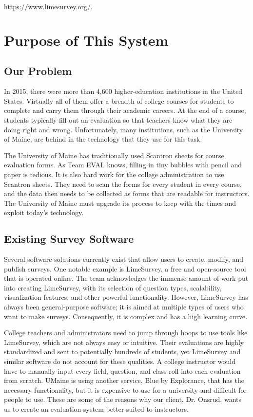 \documentclass{article}
\begin{document}
https://www.limesurvey.org/.

\section{Purpose of This System}

\subsection{Our Problem}

In 2015, there were more than 4,600 higher-education institutions in the United States. Virtually all of them offer a breadth of college courses for students to complete and carry them through their academic careers. At the end of a course, students typically fill out an evaluation so that teachers know what they are doing right and wrong. Unfortunately, many institutions, such as the University of Maine, are behind in the technology that they use for this task.

The University of Maine has traditionally used Scantron sheets for course evaluation forms. As Team EVAL knows, filling in tiny bubbles with pencil and paper is tedious. It is also hard work for the college administration to use Scantron sheets. They need to scan the forms for every student in every course, and the data then needs to be collected as forms that are readable for instructors. The University of Maine must upgrade its process to keep with the times and exploit today's technology.

\subsection{Existing Survey Software}

Several software solutions currently exist that allow users to create, modify, and publish surveys. One notable example is LimeSurvey, a free and open-source tool that is operated online. The team acknowledges the immense amount of work put into creating LimeSurvey, with its selection of question types, scalability, visualization features, and other powerful functionality. However, LimeSurvey has always been general-purpose software; it is aimed at multiple types of users who want to make surveys. Consequently, it is complex and has a high learning curve.

College teachers and administrators need to jump through hoops to use tools like LimeSurvey, which are not always easy or intuitive. Their evaluations are highly standardized and sent to potentially hundreds of students, yet LimeSurvey and similar software do not account for these qualities. A college instructor would have to manually input every field, question, and class roll into each evaluation from scratch. UMaine is using another service, Blue by Explorance, that has the necessary functionality, but it is expensive to use for a university and difficult for people to use. These are some of the reasons why our client, Dr. Onsrud, wants us to create an evaluation system better suited to instructors.
\end{document}

